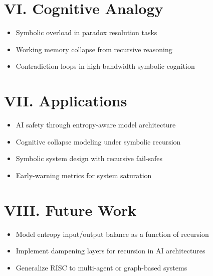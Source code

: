 \documentclass[12pt]{article}
\begin{document}
\section*{VI. Cognitive Analogy}

\begin{itemize}
  \item Symbolic overload in paradox resolution tasks
  \item Working memory collapse from recursive reasoning
  \item Contradiction loops in high-bandwidth symbolic cognition
\end{itemize}

\section*{VII. Applications}

\begin{itemize}
  \item AI safety through entropy-aware model architecture
  \item Cognitive collapse modeling under symbolic recursion
  \item Symbolic system design with recursive fail-safes
  \item Early-warning metrics for system saturation
\end{itemize}

\section*{VIII. Future Work}

\begin{itemize}
  \item Model entropy input/output balance as a function of recursion
  \item Implement dampening layers for recursion in AI architectures
  \item Generalize RISC to multi-agent or graph-based systems
\end{itemize}
\end{document}
